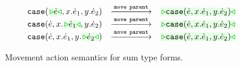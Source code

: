 \begin{figure}
\begin{displaymath}
\begin{array}{@{}rcl}
  \\
  \TABperformMove
      {      {\hcase{\zwsel{\hexp}}{x}{\hexp_1}{y}{\hexp_2}}}
      {\aMove{\dParent}}
      {\zwsel{\hcase{{\hexp}}{x}{\hexp_1}{y}{\hexp_2}}}
  \\
  \TABperformMove
      {      {\hcase{{\hexp}}{x}{\zwsel{\hexp_1}}{y}{\hexp_2}}}
      {\aMove{\dParent}}
      {\zwsel{\hcase{{\hexp}}{x}{\hexp_1}{y}{\hexp_2}}}
  \\
  \TABperformMove
      {      {\hcase{{\hexp}}{x}{\hexp_1}{y}{\zwsel{\hexp_2}}}}
      {\aMove{\dParent}}
      {\zwsel{\hcase{{\hexp}}{x}{\hexp_1}{y}{\hexp_2}}}
\end{array}
\end{displaymath}
\caption{Movement action semantics for sum type forms.}
\label{fig:sum-move}
\end{figure}


\iffalse
\begin{displaymath}
\begin{array}{@{}r@{~}l@{~~~}c@{~~~}ll@{~~}}
  \multicolumn{5}{l}{\textbf{Type Construction Actions for Sum Type}:}
  \\
  \TABperformTyp{\zwsel{\hehole}}{\aConstructx{\fsum}}
  {\tsum{\zwsel{\hehole}}{\hehole}}
  \\[3mm]
  \multicolumn{5}{l}{\textbf{Analytical Construction Actions for Sum Type}:}
  \\
  \TABperformAna{\hGamma}{\zwsel{\hehole}}
              {\tsum{\hehole}{\hehole}}
              {\aConstructx{\finj{i}}}
              {\hinj{i}{\zwsel{\hehole}}}
  \\
  \TABperformAna{\hGamma}{\zwsel{\hehole}}
              {\htau, \tincompat{\htau}{ \tsum{\hehole}{\hehole} }}
              {\aConstructx{\finj{i}}}
              {\hhole{\hinj{i}{\zwsel{\hehole}}}}
  \\
  \TABperformAna{\hGamma}{\zwsel{\hehole}}
              {\htau}
              {\aConstructx{\fcase{x}{y}}}
              {\hcase{\zwsel{\hehole}}{x}{\hehole}{y}{\hehole}}

\end{array}
\end{displaymath}
\fi
